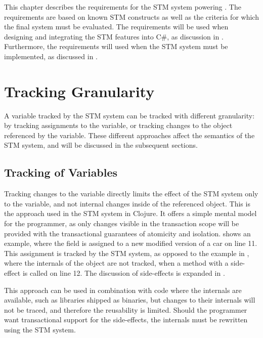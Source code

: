 \makeatletter {}\makeatother
{}
This chapter describes the requirements for the \ac{STM} system powering \stmname. The requirements are based on known \ac{STM} constructs as well as the criteria for which the final system must be evaluated. The requirements will be used when designing and integrating the \ac{STM} features into C\#, as discussion in . Furthermore, the requirements will used when the \ac{STM} system must be implemented, as discussed in .
\label{sec:stm_requirements}

\section{Tracking Granularity}\label{sec:tracking}
A variable tracked by the \ac{STM} system can be tracked with different granularity: by tracking assignments to the variable, or tracking changes to the object referenced by the variable. These different approaches affect the semantics of the \ac{STM} system, and will be discussed in the subsequent sections.

\subsection{Tracking of Variables} 
Tracking changes to the variable directly limits the effect of the \ac{STM} system only to the variable, and not internal changes inside of the referenced object. This is the approach used in the \ac{STM} system in Clojure\cite{clojureConcurrent}. It offers a simple mental model for the programmer, as only changes visible in the transaction scope will be provided with the transactional guarantees of atomicity and isolation.   shows an example, where the field  is assigned to a new modified version of a car on line 11. This assignment is tracked by the \ac{STM} system, as opposed to the example in , where the internals of the object are not tracked, when a method with a side-effect is called on line 12. The discussion of side-effects is expanded in .

This approach can be used in combination with code where the internals are available, such as libraries shipped as binaries, but changes to their internals will not be traced, and therefore the reusability is limited. Should the programmer want transactional support for the side-effects, the internals must be rewritten using the \ac{STM} system.

